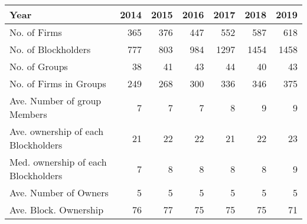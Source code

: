\begin{tabular}{lrrrrrr}
\toprule
Year &  2014 &  2015 &  2016 &  2017 &  2018 &  2019 \\
\midrule
No. of Firms                        &   365 &   376 &   447 &   552 &   587 &   618 \\
No. of Blockholders                 &   777 &   803 &   984 &  1297 &  1454 &  1458 \\
No. of Groups                       &    38 &    41 &    43 &    44 &    40 &    43 \\
No. of Firms in Groups              &   249 &   268 &   300 &   336 &   346 &   375 \\
Ave. Number of group Members        &     7 &     7 &     7 &     8 &     9 &     9 \\
Ave. ownership of each Blockholders &    21 &    22 &    22 &    21 &    22 &    23 \\
Med. ownership of each Blockholders &     7 &     8 &     8 &     8 &     8 &     9 \\
Ave. Number of Owners               &     5 &     5 &     5 &     5 &     5 &     5 \\
Ave. Block. Ownership               &    76 &    77 &    75 &    75 &    75 &    71 \\
\bottomrule
\end{tabular}
